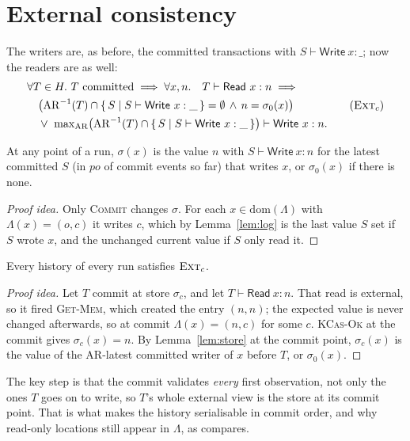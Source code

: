 \documentclass[manuscript,nonacm]{acmart}
\theoremstyle{acmdefinition}
\newcommand{\po}{\mathit{po}}
\newcommand{\Lg}{\Lambda}                         %
\newcommand{\dom}[1]{\mathrm{dom}(#1)}
\begin{document}
\section{External consistency}
\label{sec:ext}

The writers are, as before, the committed transactions with
$S \vdash \mathsf{Write}\ x : \_$; now the readers are as well:
\[
\begin{aligned}
&\forall T \in H.\ T \text{ committed} \implies \forall x, n.\quad T \vdash \mathsf{Read}\ x : n \implies {}\\
&\quad \bigl(\mathrm{AR}^{-1}(T) \cap \{\, S \mid S \vdash \mathsf{Write}\ x : \_ \,\} = \emptyset \,\wedge\, n = \sigma_0(x)\bigr)\\
&\quad {}\vee\ \mathrm{max}_{\mathrm{AR}}\bigl(\mathrm{AR}^{-1}(T) \cap \{\, S \mid S \vdash \mathsf{Write}\ x : \_ \,\}\bigr) \vdash \mathsf{Write}\ x : n .
\end{aligned}
\tag{$\textsc{Ext}_c$}
\]

\begin{lemma}
\label{lem:store}
At any point of a run, $\sigma(x)$ is the value $n$ with
$S \vdash \mathsf{Write}\ x : n$ for the latest committed $S$ (in $\po$ of
commit events so far) that writes $x$, or $\sigma_0(x)$ if there is none.
\end{lemma}
\begin{proof}[Proof idea]
Only \textsc{Commit} changes $\sigma$. For each $x \in \dom{\Lg}$ with
$\Lg(x) = (o,c)$ it writes $c$, which by Lemma~\ref{lem:log} is the last value
$S$ set if $S$ wrote $x$, and the unchanged current value if $S$ only read it.
\end{proof}

\begin{theorem}
Every history of every run satisfies $\textsc{Ext}_c$.
\end{theorem}
\begin{proof}[Proof idea]
Let $T$ commit at store $\sigma_c$, and let $T \vdash \mathsf{Read}\ x : n$.
That read is external, so it fired \textsc{Get-Mem}, which created the entry
$(n,n)$; the expected value is never changed afterwards, so at commit
$\Lg(x) = (n,c)$ for some $c$. \textsc{KCas-Ok} at the commit gives
$\sigma_c(x) = n$. By Lemma~\ref{lem:store} at the commit point, $\sigma_c(x)$
is the value of the AR-latest committed writer of $x$ before $T$, or
$\sigma_0(x)$.
\end{proof}

The key step is that the commit validates \emph{every} first observation, not
only the ones $T$ goes on to write, so $T$'s whole external view is the store at
its commit point. That is what makes the history serialisable in commit order,
and why read-only locations still appear in $\Lg$, as compares.
\end{document}
